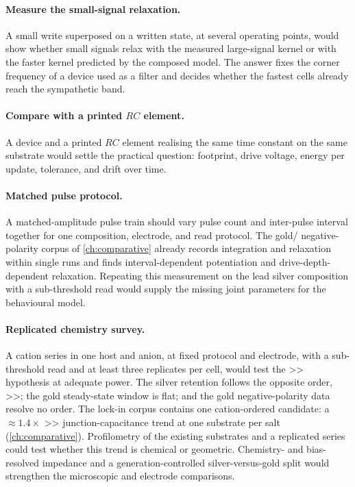 \documentclass[12pt, twoside]{report}
\begin{document}
\paragraph{Measure the small-signal relaxation.} A small write superposed on a written state, at several operating points, would show whether small signals relax with the measured large-signal kernel or with the faster kernel predicted by the composed model. The answer fixes the corner frequency of a device used as a filter and decides whether the fastest cells already reach the sympathetic band.

\paragraph{Compare with a printed $RC$ element.} A device and a printed $RC$ element realising the same time constant on the same substrate would settle the practical question: footprint, drive voltage, energy per update, tolerance, and drift over time.

\paragraph{Matched pulse protocol.} A matched-amplitude pulse train should vary pulse count and inter-pulse interval together for one composition, electrode, and read protocol. The gold/\TMPE{} negative-polarity corpus of \cref{ch:comparative} already records integration and relaxation within single runs and finds interval-dependent potentiation and drive-depth-dependent relaxation. Repeating this measurement on the lead silver composition with a sub-threshold read would supply the missing joint parameters for the behavioural model.

\paragraph{Replicated chemistry survey.} A cation series in one host and anion, at fixed protocol and electrode, with a sub-threshold read and at least three replicates per cell, would test the >> hypothesis at adequate power. The silver \TMPE{} retention follows the opposite order, >>; the gold steady-state window is flat; and the gold negative-polarity data resolve no order. The lock-in corpus contains one cation-ordered candidate: a \(\approx\!1.4\times\) >> junction-capacitance trend at one substrate per salt (\cref{ch:comparative}). Profilometry of the existing substrates and a replicated series could test whether this trend is chemical or geometric. Chemistry- and bias-resolved impedance and a generation-controlled silver-versus-gold split would strengthen the microscopic and electrode comparisons.
\end{document}
